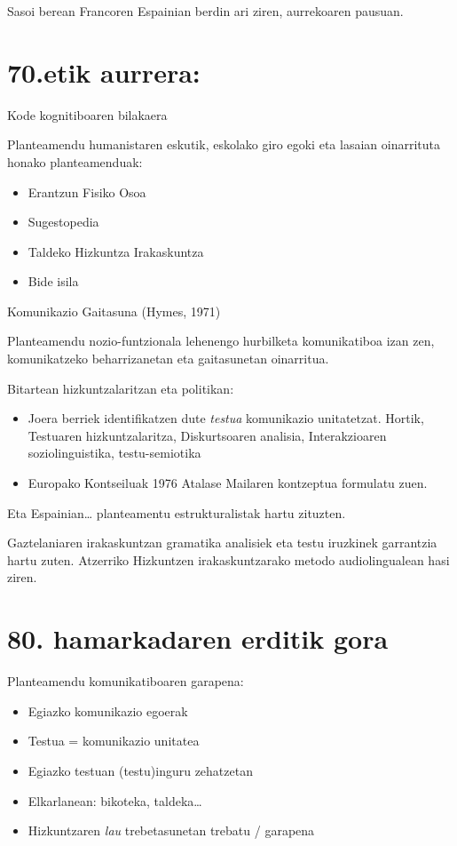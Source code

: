 \documentclass[
]{book}
\providecommand{\tightlist}{%
  \setlength{\itemsep}{0pt}\setlength{\parskip}{0pt}}
\begin{document}
Sasoi berean Francoren Espainian berdin ari ziren, aurrekoaren pausuan.

\hypertarget{etik-aurrera-1}{%
\section{70.etik aurrera:}\label{etik-aurrera-1}}

Kode kognitiboaren bilakaera

Planteamendu humanistaren eskutik, eskolako giro egoki eta lasaian oinarrituta honako planteamenduak:

\begin{itemize}
\tightlist
\item
  Erantzun Fisiko Osoa
\item
  Sugestopedia
\item
  Taldeko Hizkuntza Irakaskuntza
\item
  Bide isila
\end{itemize}

Komunikazio Gaitasuna (Hymes, 1971)

Planteamendu nozio-funtzionala lehenengo hurbilketa komunikatiboa izan zen, komunikatzeko beharrizanetan eta gaitasunetan oinarritua.

Bitartean hizkuntzalaritzan eta politikan:

\begin{itemize}
\tightlist
\item
  Joera berriek identifikatzen dute \emph{testua} komunikazio unitatetzat. Hortik, Testuaren hizkuntzalaritza, Diskurtsoaren analisia, Interakzioaren soziolinguistika, testu-semiotika
\item
  Europako Kontseiluak 1976 Atalase Mailaren kontzeptua formulatu zuen.
\end{itemize}

Eta Espainian\ldots{} planteamentu estrukturalistak hartu zituzten.

Gaztelaniaren irakaskuntzan gramatika analisiek eta testu iruzkinek garrantzia hartu zuten.
Atzerriko Hizkuntzen irakaskuntzarako metodo audiolingualean hasi ziren.

\hypertarget{hamarkadaren-erditik-gora}{%
\section{80. hamarkadaren erditik gora}\label{hamarkadaren-erditik-gora}}

Planteamendu komunikatiboaren garapena:

\begin{itemize}
\tightlist
\item
  Egiazko komunikazio egoerak
\item
  Testua = komunikazio unitatea
\item
  Egiazko testuan (testu)inguru zehatzetan
\item
  Elkarlanean: bikoteka, taldeka\ldots{}
\item
  Hizkuntzaren \emph{lau} trebetasunetan trebatu / garapena
\end{itemize}
\end{document}
